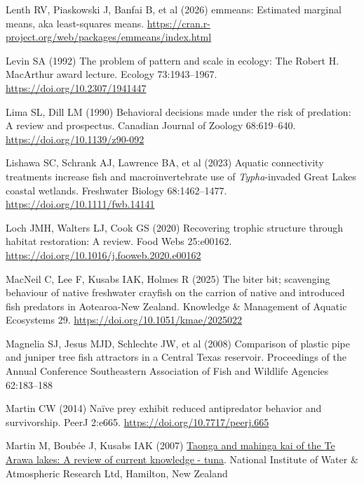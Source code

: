 \documentclass[
  12pt,
  a4paper,
  oneside]{scrbook}
\newlength{\cslhangindent}
\newenvironment{CSLReferences}[2] %
 {\begin{list}{}{%
  \setlength{\itemindent}{0pt}
  \setlength{\leftmargin}{0pt}
  \setlength{\parsep}{0pt}
  \ifodd #1
   \setlength{\leftmargin}{\cslhangindent}
   \setlength{\itemindent}{-1\cslhangindent}
  \fi
  \setlength{\itemsep}{#2\baselineskip}}}
 {\end{list}}
\renewenvironment{CSLReferences}[2]
   {\begin{list}{}{%
    \setlength{\itemindent}{0pt}
    \setlength{\leftmargin}{0pt}
    \setlength{\parsep}{0pt}
    \ifodd #1
     \setlength{\leftmargin}{\cslhangindent}
     \setlength{\itemindent}{-1\cslhangindent}
    \fi
    \setlength{\itemsep}{0.3\baselineskip}}}
   {\end{list}}%
\begin{document}
\begin{CSLReferences}{1}{1}
Lenth RV, Piaskowski J, Banfai B, et al (2026) {emmeans}: Estimated
marginal means, aka least-squares means.
\url{https://cran.r-project.org/web/packages/emmeans/index.html}

Levin SA (1992) The problem of pattern and scale in ecology: The {Robert
H. MacArthur} award lecture. Ecology 73:1943--1967.
\url{https://doi.org/10.2307/1941447}

Lima SL, Dill LM (1990) Behavioral decisions made under the risk of
predation: A review and prospectus. Canadian Journal of Zoology
68:619--640. \url{https://doi.org/10.1139/z90-092}

Lishawa SC, Schrank AJ, Lawrence BA, et al (2023) Aquatic connectivity
treatments increase fish and macroinvertebrate use of
{\emph{Typha}}-invaded {Great Lakes} coastal wetlands. Freshwater
Biology 68:1462--1477. \url{https://doi.org/10.1111/fwb.14141}

Loch JMH, Walters LJ, Cook GS (2020) Recovering trophic structure
through habitat restoration: A review. Food Webs 25:e00162.
\url{https://doi.org/10.1016/j.fooweb.2020.e00162}

MacNeil C, Lee F, Kusabs IAK, Holmes R (2025) The biter bit; scavenging
behaviour of native freshwater crayfish on the carrion of native and
introduced fish predators in {Aotearoa-New Zealand}. Knowledge \&
Management of Aquatic Ecosystems 29.
\url{https://doi.org/10.1051/kmae/2025022}

Magnelia SJ, Jesus MJD, Schlechte JW, et al (2008) Comparison of plastic
pipe and juniper tree fish attractors in a {Central Texas} reservoir.
Proceedings of the Annual Conference Southeastern Association of Fish
and Wildlife Agencies 62:183--188

Martin CW (2014) Naïve prey exhibit reduced antipredator behavior and
survivorship. PeerJ 2:e665. \url{https://doi.org/10.7717/peerj.665}

Martin M, Boubée J, Kusabs IAK (2007)
\href{https://niwa.co.nz/sites/default/files/2025-04/te_arawa_species_report_tuna_0.pdf}{Taonga
and mahinga kai of the {Te Arawa} lakes: A review of current knowledge -
tuna}. {National Institute of Water} \& {Atmospheric Research Ltd},
{Hamilton}, {New Zealand}


\end{CSLReferences}
\end{document}
